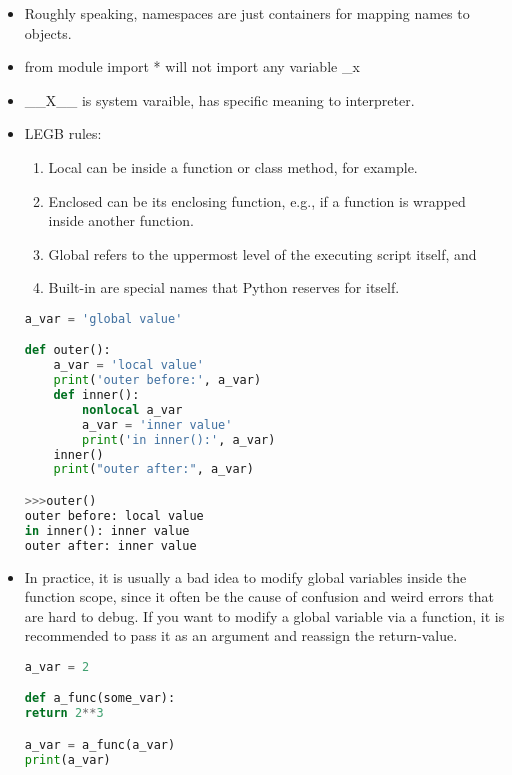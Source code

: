\documentclass[a4paper,12pt,twoside]{book}
\begin{document}
\begin{itemize}
	\item Roughly speaking, namespaces are just containers for mapping names to objects. 
	
	\item from module import * will not import  any variable \_x

	\item \_\_X\_\_ is system varaible, has specific meaning to interpreter. 

	\item LEGB rules:
	\begin{enumerate}
		\item 	Local can be inside a function or class method, for example.
		
		\item Enclosed can be its enclosing function, e.g., if a function is wrapped inside another function.
		
		\item Global refers to the uppermost level of the executing script itself, and
		
		\item Built-in are special names that Python reserves for itself.
	\end{enumerate}

\begin{lstlisting}[frame=single, language=Python]
a_var = 'global value'

def outer():
	a_var = 'local value'
	print('outer before:', a_var)
	def inner():
		nonlocal a_var
		a_var = 'inner value'
		print('in inner():', a_var)
	inner()
	print("outer after:", a_var)

>>>outer()
outer before: local value
in inner(): inner value
outer after: inner value
	\end{lstlisting}  
	
	\item In practice, it is usually a bad idea to modify global variables inside the function scope, since it often be the cause of confusion and weird errors that are hard to debug.
	If you want to modify a global variable via a function, it is recommended to pass it as an argument and reassign the return-value.
\begin{lstlisting}[frame=single, language=Python]
a_var = 2

def a_func(some_var):
return 2**3

a_var = a_func(a_var)
print(a_var)
\end{lstlisting} 


\end{itemize}
\end{document}
